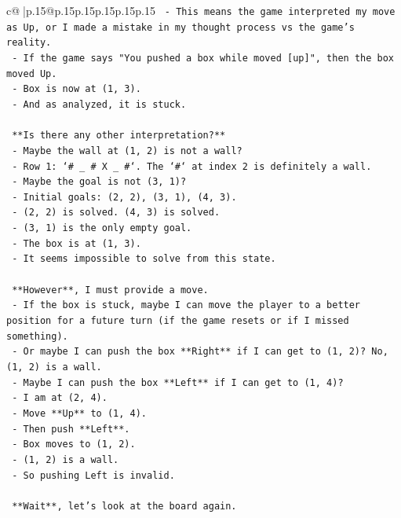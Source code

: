 \documentclass{article}
\begin{document}
{\begin{supertabular}{c@{$\;$}|p{.15\linewidth}@{}p{.15\linewidth}p{.15\linewidth}p{.15\linewidth}p{.15\linewidth}p{.15\linewidth}}
{{{\texttt{    {-} This means the game interpreted my move as Up, or I made a mistake in my thought process vs the game's reality.} \\
\texttt{    {-} If the game says "You pushed a box while moved {[}up{]}", then the box moved Up.} \\
\texttt{    {-} Box is now at (1, 3).} \\
\texttt{    {-} And as analyzed, it is stuck.} \\
\\ 
\texttt{  **Is there any other interpretation?**} \\
\texttt{  {-} Maybe the wall at (1, 2) is not a wall?} \\
\texttt{  {-} Row 1: `\# \_ \# X \_ \#`. The `\#` at index 2 is definitely a wall.} \\
\texttt{  {-} Maybe the goal is not (3, 1)?} \\
\texttt{  {-} Initial goals: (2, 2), (3, 1), (4, 3).} \\
\texttt{  {-} (2, 2) is solved. (4, 3) is solved.} \\
\texttt{  {-} (3, 1) is the only empty goal.} \\
\texttt{  {-} The box is at (1, 3).} \\
\texttt{  {-} It seems impossible to solve from this state.} \\
\\ 
\texttt{  **However**, I must provide a move.} \\
\texttt{  {-} If the box is stuck, maybe I can move the player to a better position for a future turn (if the game resets or if I missed something).} \\
\texttt{  {-} Or maybe I can push the box **Right** if I can get to (1, 2)? No, (1, 2) is a wall.} \\
\texttt{  {-} Maybe I can push the box **Left** if I can get to (1, 4)?} \\
\texttt{    {-} I am at (2, 4).} \\
\texttt{    {-} Move **Up** to (1, 4).} \\
\texttt{    {-} Then push **Left**.} \\
\texttt{    {-} Box moves to (1, 2).} \\
\texttt{    {-} (1, 2) is a wall.} \\
\texttt{    {-} So pushing Left is invalid.} \\
\\ 
\texttt{  **Wait**, let's look at the board again.} \\
}}}
\end{supertabular}}
\end{document}
